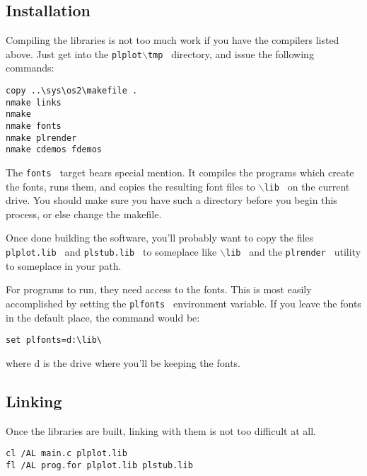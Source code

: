 \subsection{Installation}

Compiling the libraries is not too much work if you have the compilers
listed above.  Just get into the {\tt plplot$\backslash$tmp } directory, 
and issue the following commands:

\begin{verbatim}
copy ..\sys\os2\makefile .
nmake links
nmake
nmake fonts
nmake plrender
nmake cdemos fdemos
\end{verbatim}

The {\tt fonts } target bears special mention.  It compiles the programs which
create the fonts, runs them, and copies the resulting font files to 
{\tt $\backslash$lib }
on the current drive.  You should make sure you have such a directory before
you begin this process, or else change the makefile.

Once done building the software, you'll probably want to copy the files
{\tt plplot.lib } and {\tt plstub.lib } to someplace like {\tt $\backslash$lib } 
and  the {\tt plrender } utility to someplace in your path.

For programs to run, they need access to the fonts.  This is most easily
accomplished by setting the {\tt plfonts } environment variable.  If you
leave the fonts in the default place, the command would be:
\begin{verbatim}
set plfonts=d:\lib\
\end{verbatim}
where d is the drive where you'll be keeping the fonts.

\subsection{Linking}

Once the libraries are built, linking with them is not too difficult at all.

\begin{verbatim}
cl /AL main.c plplot.lib
fl /AL prog.for plplot.lib plstub.lib
\end{verbatim}

